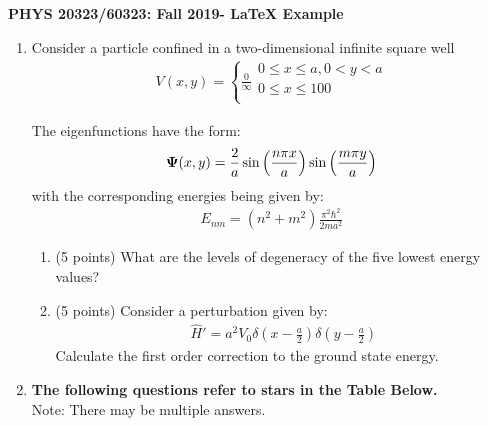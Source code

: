 \documentclass[12pt]{article}
\begin{document}
\centerline{\bf PHYS 20323/60323: Fall 2019- LaTeX Example}
\vskip 0.15in


\begin{enumerate}


\item {Consider a particle confined in a two-dimensional infinite square well}
\begin{align*}
    V(x,y)= \left\{ \frac{0}{\infty}\begin{array}{lr} 
      0\leq x \leq a   ,   0 < y < a \\
      0\leq x\leq 100 \\
   \end{array}
\end{align*}
\begin{comment}
\begin{displaymath}
   f(x) = \left\{
     \begin{array}{lr}
       1 & : x \in \mathbb{Q}\\
       0 & : x \notin \mathbb{Q}
     \end{array}
   \right.
\end{displaymath} 
\end{comment}
The eigenfunctions have the form:
\begin{align*}
    {\bf\Psi}(x,y)= \frac{2}{a}\sin{\left(\frac{n\pi x}{a}\right)} \sin{\left(\frac{m\pi y}{a}\right)}
\end{align*}
with the corresponding energies being given by:
\begin{align*}
    E_{nm}=\left(n^2 +m^2 \right) \frac{\pi^2 \hbar^2}{2ma^2}
\end{align*}
\begin{enumerate}
\item (5 points) What are the levels of degeneracy of the five lowest energy values?

\item (5 points) Consider a perturbation given by:
\begin{align*}
    \hat{H}'=a^2 V_0  \delta \left(x- \frac{a}{2}\right)\delta\left(y- \frac{a}{2}\right)
\end{align*}
Calculate the first order correction to the ground state energy.

\end{enumerate}

\vskip 0.15in

\item {\bf The following questions refer to stars in the Table Below.}\\
Note: There may be multiple answers.\\ 


\end{enumerate}
\end{document}
